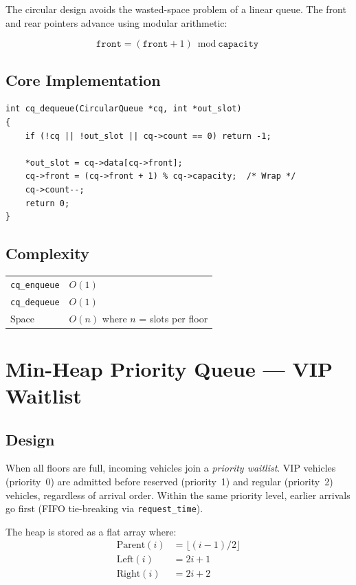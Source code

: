 \documentclass[12pt, a4paper]{report}
\begin{document}
The circular design avoids the wasted-space problem of a linear queue.
The front and rear pointers advance using modular arithmetic:

\[
  \texttt{front} = (\texttt{front} + 1) \bmod \texttt{capacity}
\]

\subsection{Core Implementation}

\begin{lstlisting}[style=cstyle, caption={Circular queue dequeue with wraparound}]
int cq_dequeue(CircularQueue *cq, int *out_slot)
{
    if (!cq || !out_slot || cq->count == 0) return -1;

    *out_slot = cq->data[cq->front];
    cq->front = (cq->front + 1) % cq->capacity;  /* Wrap */
    cq->count--;
    return 0;
}
\end{lstlisting}

\subsection{Complexity}

\begin{tabular}{ll}
  \texttt{cq\_enqueue}  & $O(1)$ \\
  \texttt{cq\_dequeue}  & $O(1)$ \\
  Space                  & $O(n)$ where $n$ = slots per floor \\
\end{tabular}

\section{Min-Heap Priority Queue --- VIP Waitlist}

\subsection{Design}

When all floors are full, incoming vehicles join a \emph{priority
waitlist}.  VIP vehicles (priority~0) are admitted before reserved
(priority~1) and regular (priority~2) vehicles, regardless of arrival
order.  Within the same priority level, earlier arrivals go first (FIFO
tie-breaking via \texttt{request\_time}).

The heap is stored as a flat array where:
\begin{align*}
  \text{Parent}(i) &= \lfloor (i-1)/2 \rfloor \\
  \text{Left}(i)   &= 2i + 1 \\
  \text{Right}(i)  &= 2i + 2
\end{align*}
\end{document}
